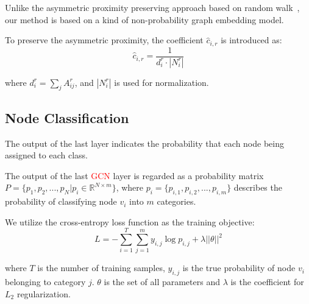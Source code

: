 Unlike the asymmetric proximity preserving approach based on random walk~\cite{zhou2017scalable}, our method is based on a kind of non-probability graph embedding model.
 
To preserve the asymmetric proximity, the coefficient $\hat c_{i,r}$ is introduced as:
\begin{equation}
\hat c_{i,r}=\frac{1}{d_i^r\cdot |N_i^r|}
\end{equation}

\noindent where $d_i^r=\sum_{j}A^r_{ij}$, and $|N_i^r|$ is used for normalization.



\subsection{Node Classification}
The output of the last layer indicates the probability that each node being assigned to each class.

The output of the last \textcolor{red}{GCN} layer is regarded as a probability matrix $P=\{p_1,p_2,...,p_N|p_i\in \mathbb{R}^{N \times m}\}$, where $p_i=\{p_{i,1},p_{i,2},...,p_{i,m}\}$ describes the probability of classifying node $v_i$ into $m$ categories.

We utilize the cross-entropy loss function as the training objective:
\begin{equation}
L=-\sum_{i=1}^T\sum_{j=1}^m y_{i,j}\log p_{i,j}+\lambda ||\theta||^2
\end{equation}

\noindent where $T$ is the number of training samples, $y_{i,j}$ is the true probability of node $v_i$ belonging to category $j$. $\theta$ is the set of all parameters and $\lambda$ is the coefficient for $L_2$  regularization.
